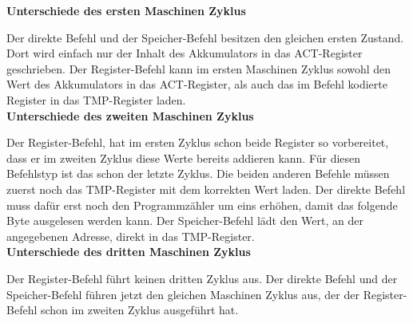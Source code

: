 \documentclass[12pt]{article}
\begin{document}
\noindent
\textbf{Unterschiede des ersten Maschinen Zyklus}

\noindent
Der direkte Befehl und der Speicher-Befehl besitzen den gleichen ersten Zustand. Dort wird einfach nur der Inhalt des Akkumulators in das ACT-Register geschrieben.
Der Register-Befehl kann im ersten Maschinen Zyklus sowohl den Wert des Akkumulators in das ACT-Register, als auch das im Befehl kodierte Register in das TMP-Register laden.
\\

\noindent
\textbf{Unterschiede des zweiten Maschinen Zyklus}

\noindent
Der Register-Befehl, hat im ersten Zyklus schon beide Register so vorbereitet, dass er im zweiten Zyklus diese Werte bereits addieren kann. Für diesen Befehlstyp ist das schon der letzte Zyklus.
Die beiden anderen Befehle müssen zuerst noch das TMP-Register mit dem korrekten Wert laden. Der direkte Befehl muss dafür erst noch den Programmzähler um eins erhöhen, damit das folgende Byte ausgelesen werden kann. Der Speicher-Befehl lädt den Wert, an der angegebenen Adresse, direkt in das TMP-Register.
\\

\noindent
\textbf{Unterschiede des dritten Maschinen Zyklus}

\noindent
Der Register-Befehl führt keinen dritten Zyklus aus.
Der direkte Befehl und der Speicher-Befehl führen jetzt den gleichen Maschinen Zyklus aus, der der Register-Befehl schon im zweiten Zyklus ausgeführt hat.
\end{document}
